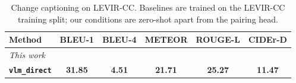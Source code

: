 \begin{table}[t]
\centering
\caption{Change captioning on LEVIR-CC. Baselines are trained on the LEVIR-CC training split; our conditions are zero-shot apart from the pairing head.}
\label{tab:levir_cc_caption}
\setlength{\tabcolsep}{3pt}
\begin{tabular}{lccccc}
\toprule
Method & BLEU-1 & BLEU-4 & METEOR & ROUGE-L & CIDEr-D \\
\midrule
\midrule
\multicolumn{6}{l}{\emph{This work}} \\
\textbf{\texttt{vlm\_direct}} & \textbf{31.85} & \textbf{4.51} & \textbf{21.71} & \textbf{25.27} & \textbf{11.47} \\
\bottomrule
\end{tabular}
\end{table}
